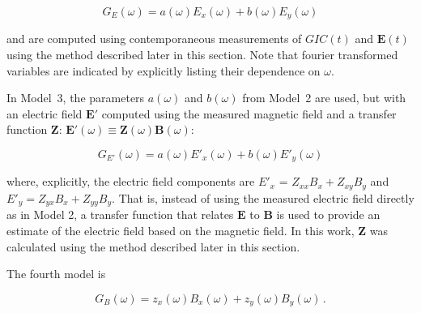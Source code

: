 \documentclass[draft,linenumbers]{agujournal2018}
\begin{document}
\begin{linenomath*}
\begin{equation}
G_E(\omega) = a(\omega)E_x(\omega) + b(\omega)E_y(\omega)
\label{model2}
\end{equation}
\end{linenomath*}
\noindent
and are computed using contemporaneous measurements of $GIC(t)$ and $\mathbf{E}(t)$ using the method described later in this section. Note that fourier transformed variables are indicated by explicitly listing their dependence on $\omega$.

In Model~3, the parameters $a(\omega)$ and $b(\omega)$ from Model~2 are used, but with an electric field $\mathbf{E}'$ computed using the measured magnetic field and a transfer function $\boldsymbol{Z}$: $\mathbf{E}'(\omega) \equiv \boldsymbol{Z}(\omega)\mathbf{B}(\omega)$:

\setcounter{equation}{2}
\begin{linenomath*}
\begin{equation}
G_{E'}(\omega) = a(\omega)E'_x(\omega) + b(\omega)E'_y(\omega)
\label{model3}
\end{equation}
\end{linenomath*}

\noindent
where, explicitly, the electric field components are $E'_x$ = $Z_{xx}B_x + Z_{xy}B_y$ and $E'_y = Z_{yx}B_x + Z_{yy}B_y$. 
That is, instead of using the measured electric field directly as in Model 2, a transfer function that relates $\mathbf{E}$ to $\mathbf{B}$ is used to provide an estimate of the electric field based on the magnetic field. In this work, $\boldsymbol{Z}$ was calculated using the method described later in this section.



The fourth model is

\begin{linenomath*}
\begin{equation}
G_B(\omega) = z_x(\omega)B_x(\omega) + z_y(\omega)B_y(\omega)\,.
\label{model4}
\end{equation}
\end{linenomath*}
\end{document}
